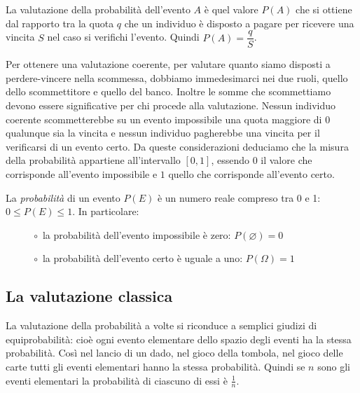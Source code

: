 \begin{definizione}
La valutazione della probabilità dell'evento \(A\) è quel valore \(P(A)\) che 
si 
ottiene dal rapporto tra la quota \(q\) che un individuo è disposto 
a pagare per ricevere una vincita \(S\) nel caso si verifichi l'evento. 
Quindi 
\(P(A)=\dfrac q S\).
\end{definizione}

Per ottenere una valutazione coerente, per valutare quanto siamo disposti a 
perdere-vincere nella scommessa, dobbiamo immedesimarci nei due ruoli, 
quello 
dello scommettitore e quello del banco. Inoltre le somme che scommettiamo 
devono 
essere significative per chi procede alla valutazione.
Nessun individuo coerente scommetterebbe su un evento impossibile una quota 
maggiore di 0 qualunque sia la vincita e nessun individuo pagherebbe una 
vincita 
per il verificarsi di un evento certo.
Da queste considerazioni deduciamo che la misura della probabilità 
appartiene 
all'intervallo \([0,1]\), essendo \( 0 \) il valore che corrisponde all'evento 
impossibile e \(1\) quello che corrisponde all'evento certo.

% 
% 
% 
% 
\begin{definizione} La \emph{probabilità} di un evento \(P(E)\) è 
un numero reale compreso tra 0 e 1: \(0\le 
P(E)\le 1\). In particolare:
\begin{itemize} [nosep]
 \item[\(\quad\circ\)]  la probabilità dell'evento impossibile è zero: 
\(P(\varnothing)=0\)
 \item[\(\quad\circ\)] la probabilità dell'evento certo è uguale a uno: 
\(P(\Omega )=1\)
\end{itemize}
\end{definizione}

\subsection{La valutazione classica}

La valutazione della probabilità a volte si riconduce a semplici giudizi di 
equiprobabilità: cioè ogni evento elementare dello spazio degli eventi ha 
la 
stessa probabilità. Così nel lancio di un dado, nel gioco della tombola, 
nel 
gioco delle carte tutti gli eventi elementari hanno la stessa probabilità. 
Quindi se \(n\) sono gli eventi elementari la probabilità di ciascuno di essi 
è 
\(\frac 1 n\).

